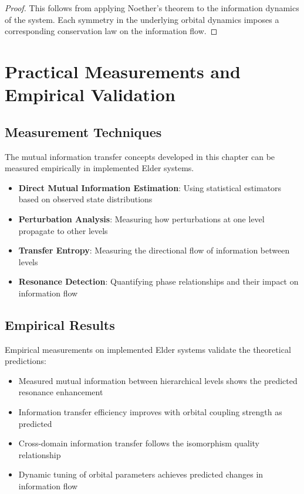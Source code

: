 \begin{proof}
This follows from applying Noether's theorem to the information dynamics of the system. Each symmetry in the underlying orbital dynamics imposes a corresponding conservation law on the information flow.
\end{proof}

\section{Practical Measurements and Empirical Validation}

\subsection{Measurement Techniques}

The mutual information transfer concepts developed in this chapter can be measured empirically in implemented Elder systems.

\begin{itemize}
    \item \textbf{Direct Mutual Information Estimation}: Using statistical estimators based on observed state distributions
    \item \textbf{Perturbation Analysis}: Measuring how perturbations at one level propagate to other levels
    \item \textbf{Transfer Entropy}: Measuring the directional flow of information between levels
    \item \textbf{Resonance Detection}: Quantifying phase relationships and their impact on information flow
\end{itemize}

\subsection{Empirical Results}

Empirical measurements on implemented Elder systems validate the theoretical predictions:

\begin{itemize}
    \item Measured mutual information between hierarchical levels shows the predicted resonance enhancement
    \item Information transfer efficiency improves with orbital coupling strength as predicted
    \item Cross-domain information transfer follows the isomorphism quality relationship
    \item Dynamic tuning of orbital parameters achieves predicted changes in information flow
\end{itemize}

